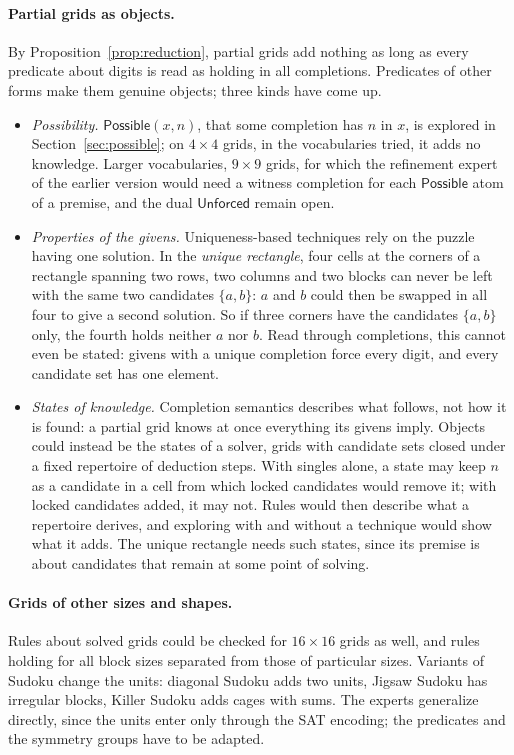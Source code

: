 \documentclass[11pt,a4paper]{article}
\theoremstyle{definition}
\theoremstyle{remark}
\newcommand{\pred}[1]{\mathsf{#1}}
\begin{document}
\paragraph{Partial grids as objects.}
By Proposition~\ref{prop:reduction}, partial grids add nothing as long as every predicate about digits is read as holding in all completions. Predicates of other forms make them genuine objects; three kinds have come up.
\begin{itemize}
  \item \emph{Possibility.} $\pred{Possible}(x, n)$, that some completion has $n$ in $x$, is explored in Section~\ref{sec:possible}; on $4 \times 4$ grids, in the vocabularies tried, it adds no knowledge. Larger vocabularies, $9 \times 9$ grids, for which the refinement expert of the earlier version would need a witness completion for each $\pred{Possible}$ atom of a premise, and the dual $\pred{Unforced}$ remain open.
  \item \emph{Properties of the givens.} Uniqueness-based techniques rely on the puzzle having one solution. In the \emph{unique rectangle}, four cells at the corners of a rectangle spanning two rows, two columns and two blocks can never be left with the same two candidates $\{a, b\}$: $a$ and $b$ could then be swapped in all four to give a second solution. So if three corners have the candidates $\{a, b\}$ only, the fourth holds neither $a$ nor $b$. Read through completions, this cannot even be stated: givens with a unique completion force every digit, and every candidate set has one element.
  \item \emph{States of knowledge.} Completion semantics describes what follows, not how it is found: a partial grid knows at once everything its givens imply. Objects could instead be the states of a solver, grids with candidate sets closed under a fixed repertoire of deduction steps. With singles alone, a state may keep $n$ as a candidate in a cell from which locked candidates would remove it; with locked candidates added, it may not. Rules would then describe what a repertoire derives, and exploring with and without a technique would show what it adds. The unique rectangle needs such states, since its premise is about candidates that remain at some point of solving.
\end{itemize}

\paragraph{Grids of other sizes and shapes.}
Rules about solved grids could be checked for $16 \times 16$ grids as well, and rules holding for all block sizes separated from those of particular sizes. Variants of Sudoku change the units: diagonal Sudoku adds two units, Jigsaw Sudoku has irregular blocks, Killer Sudoku adds cages with sums. The experts generalize directly, since the units enter only through the SAT encoding; the predicates and the symmetry groups have to be adapted.
\end{document}
